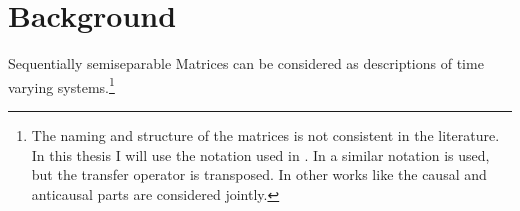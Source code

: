 \documentclass[doctype=mastersthesis,BCOR=15mm,biblatex]{ldvbook}%
\begin{document}



\chapter{Background}\label{chap:background}


Sequentially semiseparable Matrices can be considered as descriptions of time varying systems.\footnote{
The naming and structure of the matrices is not consistent in the literature.
In this thesis I will use the notation used in \cite{tong_blind_2003}. 
In \cite{dewilde_time-varying_1998} a similar notation is used, but the transfer operator is transposed.
In other works like \cite{rice_efficient_2010,chandrasekaran_fast_2002} the causal and anticausal parts are considered jointly.
}
\end{document}
